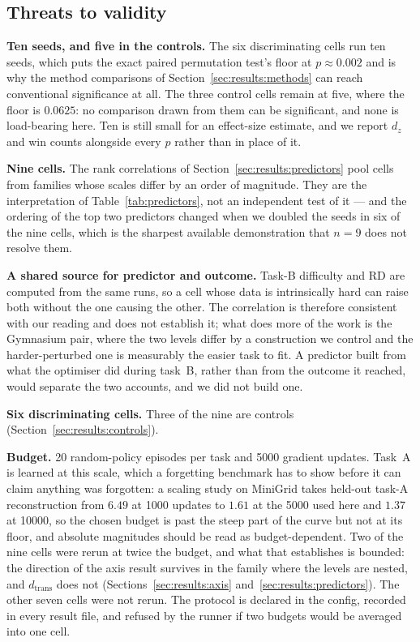 \subsection{Threats to validity}
\label{sec:results:threats}

\textbf{Ten seeds, and five in the controls.} The six discriminating cells run
ten seeds, which puts the exact paired permutation test's floor at
$p \approx 0.002$ and is why the method comparisons of
Section~\ref{sec:results:methods} can reach conventional significance at all.
The three control cells remain at five, where the floor is $0.0625$: no
comparison drawn from them can be significant, and none is load-bearing here.
Ten is still small for an effect-size estimate, and we report $d_z$ and win
counts alongside every $p$ rather than in place of it.

\textbf{Nine cells.} The rank correlations of
Section~\ref{sec:results:predictors} pool cells from families whose scales
differ by an order of magnitude. They are the interpretation of
Table~\ref{tab:predictors}, not an independent test of it --- and the ordering
of the top two predictors changed when we doubled the seeds in six of the nine
cells, which is the sharpest available demonstration that $n = 9$ does not
resolve them.

\textbf{A shared source for predictor and outcome.} Task-B difficulty and RD are
computed from the same runs, so a cell whose data is intrinsically hard can
raise both without the one causing the other. The correlation is therefore
consistent with our reading and does not establish it; what does more of the
work is the Gymnasium pair, where the two levels differ by a construction we
control and the harder-perturbed one is measurably the easier task to fit. A
predictor built from what the optimiser did during task~B, rather than from the
outcome it reached, would separate the two accounts, and we did not build one.

\textbf{Six discriminating cells.} Three of the nine are controls
(Section~\ref{sec:results:controls}).

\textbf{Budget.} 20 random-policy episodes per task and 5000 gradient updates.
Task~A is learned at this scale, which a forgetting benchmark has to show before
it can claim anything was forgotten: a scaling study on MiniGrid takes held-out
task-A reconstruction from $6.49$ at 1000 updates to $1.61$ at the 5000 used
here and $1.37$ at 10000, so the chosen budget is past the steep part of the
curve but not at its floor, and absolute magnitudes should be read as
budget-dependent. Two of the nine cells were rerun at twice the budget, and what
that establishes is bounded: the direction of the axis result survives in the
family where the levels are nested, and $d_{\mathrm{trans}}$ does not
(Sections~\ref{sec:results:axis} and~\ref{sec:results:predictors}). The other
seven cells were not rerun. The protocol is declared in the config, recorded in
every result file, and refused by the runner if two budgets would be averaged
into one cell.

